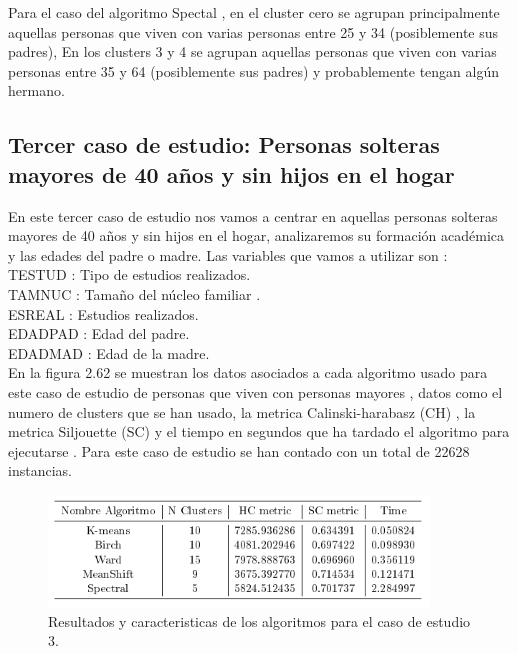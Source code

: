 	Para el caso del algoritmo Spectal , en el cluster cero se agrupan principalmente 
	aquellas personas que viven con varias personas entre 25 y 34 (posiblemente sus padres),
	En los clusters 3 y 4 se agrupan aquellas personas que viven con varias personas entre 35 y 64
	(posiblemente sus padres) y probablemente tengan algún hermano. 


	\subsection[Caso de estudio 3: Personas solteras mayores de 40 años y sin hijos en el hogar]{Tercer caso de estudio: Personas solteras mayores de 40 años y sin hijos en el hogar}

	En este tercer caso de estudio nos vamos a centrar en aquellas personas solteras mayores de 40 años y sin hijos en el hogar, 
	analizaremos su formación académica y las edades del padre o madre.
	Las variables que vamos a utilizar son : \\

	TESTUD : Tipo de estudios realizados.  \\
	TAMNUC : Tamaño del núcleo familiar . \\
	ESREAL : Estudios realizados. \\
	EDADPAD : Edad del padre. \\
	EDADMAD : Edad de la madre. \\

	En la figura 2.62 se muestran los datos asociados a cada algoritmo usado para este caso de estudio
	de personas que viven con personas mayores , datos como el numero de clusters que se han usado,
	la metrica Calinski-harabasz (CH) , la metrica Siljouette (SC) y el tiempo en segundos que ha tardado
	el algoritmo para ejecutarse . Para este caso de estudio se han contado con un total de 22628 instancias.\\

	\begin{figure}[htb]
		\centering
		\includegraphics[width=0.9\textwidth]{./imagenes/caso3/metricas_algoritmos_caso3}
		\caption{Resultados y caracteristicas de los algoritmos para el caso de estudio 3.} \label{fig:1}
	\end{figure}

